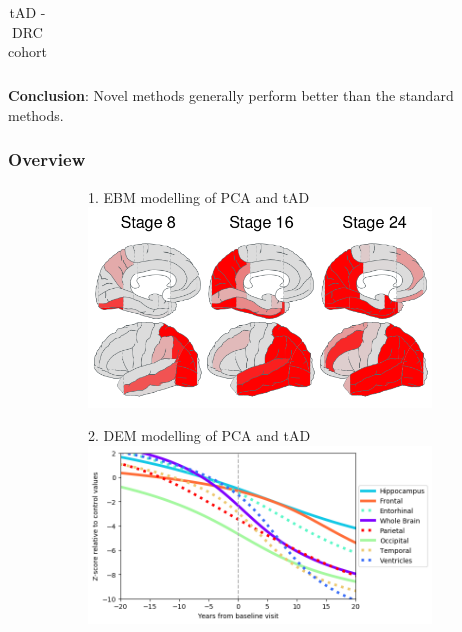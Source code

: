 \documentclass[10pt,xcolor=table]{beamer}
\begin{document}
\begin{frame}
{{\begin{table}[ht]
\begin{tabular}{c | c | c | c | c}
 \end{tabular}
 \caption{tAD - DRC cohort}
 \label{tab:drcStagingResAD}
\end{table}

\par}

\textbf{Conclusion}: Novel methods generally perform better than the standard methods.

}
\vspace{2em}

\end{frame}

\begin{frame}
\frametitle{Overview}

\vspace{-1em}
\begin{figure}
\centering
\begin{subfigure}{0.47\textwidth}
\centering
{
1. EBM modelling of PCA and tAD\\
\includegraphics[scale=0.15]{ebm_thumb.png}
}
\end{subfigure}
\begin{subfigure}{0.47\textwidth}
\centering
{
2. DEM  modelling of PCA and tAD\\
\includegraphics[scale=0.15]{../images/dem/mriSmallSebPaper_DEMStdPCA_trajAlign.png}
}
\end{subfigure}


\end{figure}
\end{frame}
\end{document}
